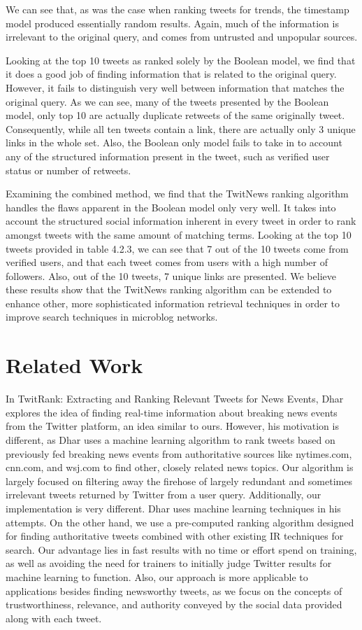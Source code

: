 \documentclass[10pt]{proc}
\begin{document}
  We can see that, as was the case when ranking tweets for trends, the timestamp model produced essentially random results. Again, much of the information is irrelevant to the original query, and comes from untrusted and unpopular sources.

  Looking at the top 10 tweets as ranked solely by the Boolean model, we find that it does a good job of finding information that is related to the original query. However, it fails to distinguish very well between information that matches the original query. As we can see, many of the tweets presented by the Boolean model, only top 10 are actually duplicate retweets of the same originally tweet. Consequently, while all ten tweets contain a link, there are actually only 3 unique links in the whole set. Also, the Boolean only model fails to take in to account any of the structured information present in the tweet, such as verified user status or number of retweets.

  Examining the combined method, we find that the TwitNews ranking algorithm handles the flaws apparent in the Boolean model only very well. It takes into account the structured social information inherent in every tweet in order to rank amongst tweets with the same amount of matching terms. Looking at the top 10 tweets provided in table 4.2.3, we can see that 7 out of the 10 tweets come from verified users, and that each tweet comes from users with a high number of followers. Also, out of the 10 tweets, 7 unique links are presented. We believe these results show that the TwitNews ranking algorithm can be extended to enhance other, more sophisticated information retrieval techniques in order to improve search techniques in microblog networks.

\section{Related Work}
In TwitRank: Extracting and Ranking Relevant Tweets for News Events\cite{twitrank}, Dhar explores the idea of finding real-time information about breaking news events from the Twitter platform, an idea similar to ours. However, his motivation is different, as Dhar uses a machine learning algorithm to rank tweets based on previously fed breaking news events from authoritative sources like nytimes.com, cnn.com, and wsj.com to find other, closely related news topics. Our algorithm is largely focused on filtering away the firehose of largely redundant and sometimes irrelevant tweets returned by Twitter from a user query. Additionally, our implementation is very different. Dhar uses machine learning techniques in his attempts. On the other hand, we use a pre-computed ranking algorithm designed for finding authoritative tweets combined with other existing IR techniques for search.  Our advantage lies in fast results with no time or effort spend on training, as well as avoiding the need for trainers to initially judge Twitter results for machine learning to function. Also, our approach is more applicable to applications besides finding newsworthy tweets, as we focus on the concepts of trustworthiness, relevance, and authority conveyed by the social data provided along with each tweet.
\end{document}
